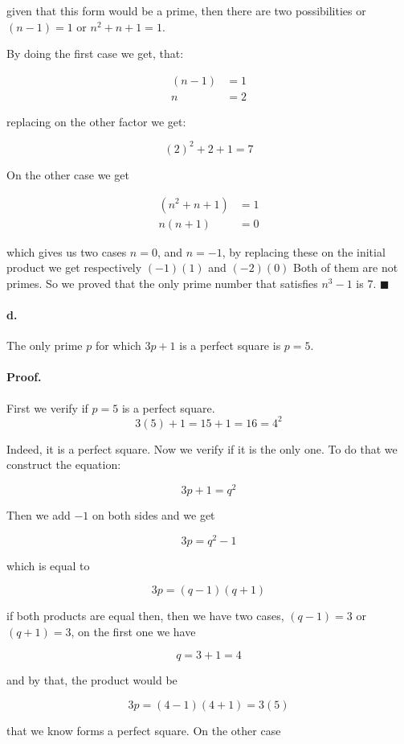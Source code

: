 \documentclass{article}
\begin{document}
given that this form would be a prime, then there are two possibilities or $(n - 1) = 1$ or $n^2 + n + 1 = 1$.

By doing the first case we get, that:

\begin{align*}
    (n - 1) &=  1\\
    n &= 2
\end{align*}

replacing on the other factor we get:

$$(2)^2 + 2 + 1 = 7$$

On the other case we get

\begin{align*}
    (n^2 + n + 1) &=  1\\
    n(n + 1) &= 0
\end{align*}

which gives us two cases $n=0$, and $n = -1$, by replacing these on the initial product we get respectively $(-1)(1)$ and $(-2)(0)$ Both of them are not primes. So we proved that the only prime number that satisfies $n^3 - 1$ is 7. $\blacksquare$

\paragraph{d.} The only prime $p$ for which $3p + 1$ is a perfect square is $p = 5$.

\paragraph{Proof.} First we verify if $p=5$ is a perfect square.
$$3(5) + 1 = 15 + 1 = 16 = 4^2$$

Indeed, it is a perfect square. Now we verify if it is the only one. To do that we construct the equation:

$$3p + 1 = q^2$$

Then we add $-1$ on both sides and we get

$$3p = q^2 - 1$$

which is equal to

$$3p = (q - 1) (q + 1)$$

if both products are equal then, then we have two cases, $(q - 1) = 3$ or $(q + 1) = 3$, on the first one we have

$$q = 3 + 1 = 4$$

and by that, the product would be

$$3p = (4 - 1)(4 +1) = 3(5)$$

that we know forms a perfect square. On the other case
\end{document}
